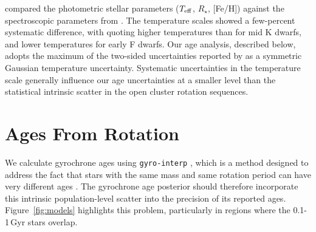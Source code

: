 \documentclass[11pt,twocolumn,tighten]{aastex63}
\begin{document}
\citet{David_2021} compared the photometric
 stellar parameters ($T_{\rm eff}$,
$R_\star$, [Fe/H]) against the spectroscopic parameters from
\citet{Fulton_2018}.  The temperature scales showed a few-percent
systematic difference, with  quoting higher
temperatures than  for mid K dwarfs,
and lower temperatures for early F dwarfs.  Our age analysis,
described below, adopts the maximum of the two-sided
uncertainties reported by  as a
symmetric Gaussian temperature uncertainty.  Systematic
uncertainties in the temperature scale generally influence 
our age uncertainties at a
smaller level than the statistical intrinsic scatter in the
open cluster rotation sequences.


\begin{figure*}[!t]
	\begin{center}
		\leavevmode
	\end{center}
	\vspace{-0.6cm}
	\caption{
		{\bf The models.}
		Points represent $10^4$ draws from models that have been fitted to
		rotation periods \citep{Bouma_2023} and lithium equivalent widths
		\citep[EWs;][]{Jeffries_2023} of stars in open clusters.  Lines
		are the ``mean models'' at various ages.  The intrinsic dispersion
		in rotation and lithium about these mean models, which is what the
		models fit, sets the theoretical precision floor for the
		age-dating methods.    Additional sources of uncertainty,
		including measurement uncertainty, impose further limits on
		achievable precision.  These models are calibrated using open
		clusters younger than 4\,Gyr.  The displayed points assume a
		uniform distribution in temperature for visual clarity.  The sizes
		of the points are the same in each panel, so that low apparent
		density signifies greater dispersion around the mean.
		\label{fig:models}
	}
\end{figure*}

\section{Ages From Rotation}
\label{sec:rotage}



We calculate gyrochrone ages using \texttt{gyro-interp}
\citep{Bouma_2023}, which is a method designed to address the fact
that stars with the same mass and same rotation period can have very
different ages \citep[e.g.][]{Curtis_2019_ngc6811}.  The gyrochrone
age posterior should therefore incorporate this intrinsic
population-level scatter into the precision of its reported
ages.  Figure~\ref{fig:models} highlights this problem,
particularly in regions where the 0.1-1\,Gyr stars overlap.
\end{document}
